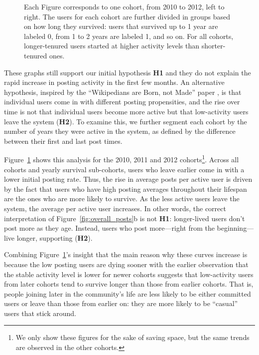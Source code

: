 \documentclass[10pt, oneside, onecolumn]{article}
\begin{document}
\begin{figure}[!tb]
\centering
{}
\caption{Each Figure corresponds to one cohort, from 2010 to 2012, left to right. The users for each cohort are further divided in groups based on how long they survived: users that survived up to 1 year are labeled 0, from 1 to 2 years are labeled 1, and so on.  For all cohorts, longer-tenured users started at higher activity levels than shorter-tenured ones.}
\label{fig:avr_posts_per_user_for_surviving_year}
\end{figure}

These graphs still support our initial hypothesis \textbf{H1} 
and they do not explain the rapid increase in posting activity in the first few months.  An alternative hypothesis, inspired by the ``Wikipedians are Born, not Made'' paper \cite{Panciera2009}, is that individual users come in with different posting propensities, and the rise over time is not that individual users become more active but that low-activity users leave the system (\textbf{H2}).  To examine this, we further segment each cohort by the number of years they were active in the system, as defined by the difference between their first and last post times.
 
Figure~\ref{fig:avr_posts_per_user_for_surviving_year} shows this analysis for the 2010, 2011 and 2012 cohorts\footnote{We only show these figures for the sake of saving space, but the same trends are observed in the other cohorts.}.  Across all cohorts and yearly survival sub-cohorts, users who leave earlier come in with a lower initial posting rate.  Thus, the rise in average posts per active user is driven by the fact that users who have high posting averages throughout their lifespan are the ones who are more likely to survive.  As the less active users leave the system, the average per active user increases.  In other words, the correct interpretation of Figure~\ref{fig:overall_posts}b is not \textbf{H1}: longer-lived users don't post more as they age.  Instead, users who post more---right from the beginning---live longer, supporting (\textbf{H2}). 

Combining Figure~\ref{fig:avr_posts_per_user_for_surviving_year}'s insight that the main reason why these curves increase is because the low posting users are dying sooner with the earlier observation that the stable activity level is lower for newer cohorts suggests that low-activity users from later cohorts tend to survive longer than those from earlier cohorts.  That is, people joining later in the community's life are less likely to be either committed users or leave than those from earlier on: they are more likely to be ``casual'' users that stick around.
\end{document}
